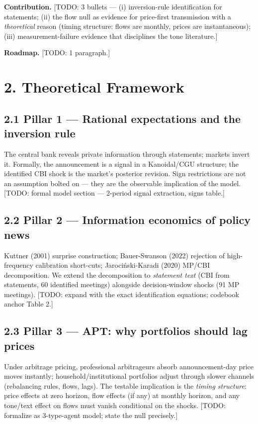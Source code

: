 \textbf{Contribution.} {[}TODO: 3 bullets --- (i) inversion-rule identification for statements; (ii) the flow null as evidence for price-first transmission with a \emph{theoretical} reason (timing structure: flows are monthly, prices are instantaneous); (iii) measurement-failure evidence that disciplines the tone literature.{]}

\textbf{Roadmap.} {[}TODO: 1 paragraph.{]}

\section{2. Theoretical Framework}\label{theoretical-framework}

\subsection{2.1 Pillar 1 --- Rational expectations and the inversion rule}\label{pillar-1-rational-expectations-and-the-inversion-rule}

The central bank reveals private information through statements; markets invert it. Formally, the announcement is a signal in a Kanoidal/CGU structure; the identified CBI shock is the market's posterior revision. Sign restrictions are not an assumption bolted on --- they are the observable implication of the model. {[}TODO: formal model section --- 2-period signal extraction, signs table.{]}

\subsection{2.2 Pillar 2 --- Information economics of policy news}\label{pillar-2-information-economics-of-policy-news}

Kuttner (2001) surprise construction; Bauer-Swanson (2022) rejection of high-frequency calibration short-cuts; Jarociński-Karadi (2020) MP/CBI decomposition. We extend the decomposition to \emph{statement text} (CBI from statements, 60 identified meetings) alongside decision-window shocks (91 MP meetings). {[}TODO: expand with the exact identification equations; codebook anchor Table 2.{]}

\subsection{2.3 Pillar 3 --- APT: why portfolios should lag prices}\label{pillar-3-apt-why-portfolios-should-lag-prices}

Under arbitrage pricing, professional arbitrageurs absorb announcement-day price moves instantly; household/institutional portfolios adjust through slower channels (rebalancing rules, flows, lags). The testable implication is the \emph{timing structure}: price effects at zero horizon, flow effects (if any) at monthly horizon, and any tone/text effect on flows must vanish conditional on the shocks. {[}TODO: formalize as 3-type-agent model; state the null precisely.{]}

